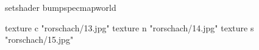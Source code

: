 setshader bumpspecmapworld

    texture c "rorschach/13.jpg"
    texture n "rorschach/14.jpg"
    texture s "rorschach/15.jpg"
